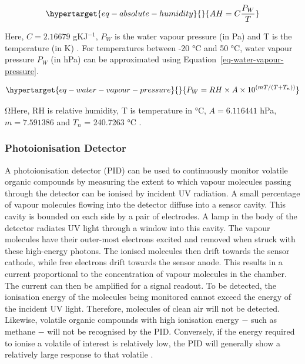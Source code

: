 \documentclass[
  a4paper,
]{scrbook}
\begin{document}
\begin{equation}\protect\hypertarget{eq-absolute-humidity}{}{ 
AH = C\frac{P_W}{T}
}\label{eq-absolute-humidity}\end{equation}

Here, \(C = 2.16679\) gKJ\(^{-1}\), \(P_W\) is the water vapour pressure
(in Pa) and T is the temperature (in K) \autocite{humidityformula}. For
temperatures between -20 °C and 50 °C, water vapour pressure \(P_W\) (in
hPa) can be approximated using Equation~\ref{eq-water-vapour-pressure}.

\begin{equation}\protect\hypertarget{eq-water-vapour-pressure}{}{
P_W = RH \times A \times 10^{(mT/(T+T_{n}))}
}\label{eq-water-vapour-pressure}\end{equation}

ΩHere, RH is relative humidity, T is temperature in °C, \(A = 6.116441\)
hPa, \(m = 7.591386\) and \(T_{n}\) = 240.7263 °C
\autocite{humidityformula}.

\hypertarget{photoionisation-detector}{%
\subsubsection*{Photoionisation
Detector}\label{photoionisation-detector}}

A photoionisation detector (PID) can be used to continuously monitor
volatile organic compounds by measuring the extent to which vapour
molecules passing through the detector can be ionised by incident UV
radiation. A small percentage of vapour molecules flowing into the
detector diffuse into a sensor cavity. This cavity is bounded on each
side by a pair of electrodes. A lamp in the body of the detector
radiates UV light through a window into this cavity. The vapour
molecules have their outer-most electrons excited and removed when
struck with these high-energy photons. The ionised molecules then drift
towards the sensor cathode, while free electrons drift towards the
sensor anode. This results in a current proportional to the
concentration of vapour molecules in the chamber. The current can then
be amplified for a signal readout. To be detected, the ionisation energy
of the molecules being monitored cannot exceed the energy of the
incident UV light. Therefore, molecules of clean air will not be
detected. Likewise, volatile organic compounds with high ionisation
energy \(-\) such as methane \(-\) will not be recognised by the PID.
Conversely, if the energy required to ionise a volatile of interest is
relatively low, the PID will generally show a relatively large response
to that volatile \autocite{Ionscience,PIDmanual}.
\end{document}
